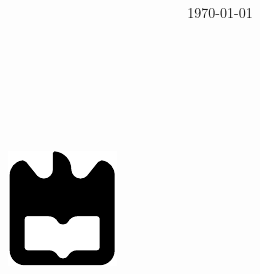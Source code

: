\documentclass{report}
\begin{document}

%
%
\begin{titlepage}

\begin{center}
%
\vspace*{50mm}
%
{\Huge \titulo}\\
%
\vspace{10mm}
%
{\Large \empresa}\\
%
\vspace{10mm}
%
{\LARGE \autores}\\
%
\vspace{30mm}
%
\begin{figure}[h]
\center
\includegraphics{images/ua}\label{fig:ua-title-logo}
\end{figure}
\end{center}
\end{titlepage}

\title{%
{\Huge\textbf{\titulo}}\\
{\vspace{20mm}}
{\Large \departamento\\ \empresa}
}
%
\author{%
    \autores \\
    \autorescontactos
}
%
\date{\today}
%
\maketitle




\tableofcontents


\clearpage
{}











\pagebreak
\end{document}
